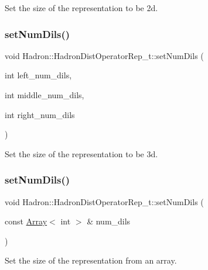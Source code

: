 Set the size of the representation to be 2d. 

\mbox{\label{classHadron_1_1HadronDistOperatorRep__t_a3e971d8bbb79f0024b87f54b4db56083}} 
\subsubsection{\texorpdfstring{setNumDils()}{setNumDils()}\hspace{0.1cm}{\footnotesize\ttfamily [2/3]}}
{\footnotesize\ttfamily void Hadron\+::\+Hadron\+Dist\+Operator\+Rep\+\_\+t\+::set\+Num\+Dils (\begin{DoxyParamCaption}\item[{int}]{left\+\_\+num\+\_\+dils,  }\item[{int}]{middle\+\_\+num\+\_\+dils,  }\item[{int}]{right\+\_\+num\+\_\+dils }\end{DoxyParamCaption})}



Set the size of the representation to be 3d. 

\mbox{\label{classHadron_1_1HadronDistOperatorRep__t_ae1052d3d087b32a01f02eda6e802d196}} 
\subsubsection{\texorpdfstring{setNumDils()}{setNumDils()}\hspace{0.1cm}{\footnotesize\ttfamily [3/3]}}
{\footnotesize\ttfamily void Hadron\+::\+Hadron\+Dist\+Operator\+Rep\+\_\+t\+::set\+Num\+Dils (\begin{DoxyParamCaption}\item[{const \mbox{\hyperlink{classXMLArray_1_1Array}{Array}}$<$ int $>$ \&}]{num\+\_\+dils }\end{DoxyParamCaption})}



Set the size of the representation from an array. 

